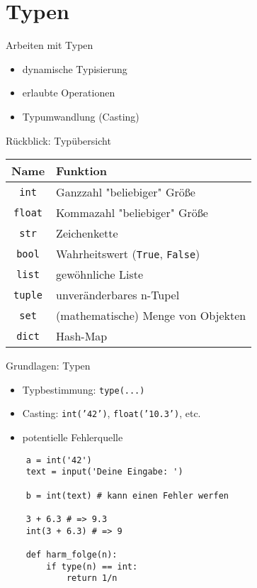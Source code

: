 \section{Typen}
\begin{frame}{Arbeiten mit Typen}
	\begin{itemize}
		\item dynamische Typisierung
		\item erlaubte Operationen
		\item Typumwandlung (Casting)
	\end{itemize}
\end{frame}

\begin{frame}{Rückblick: Typübersicht}
    \begin{tabular}{c|l}
		Name & Funktion \\ \hline
		\texttt{int} & Ganzzahl "beliebiger" Größe \\
		\texttt{float} & Kommazahl "beliebiger" Größe \\
		\texttt{str} & Zeichenkette \\
		\texttt{bool} & Wahrheitswert (\texttt{True}, \texttt{False})\\ \hline
		\texttt{list} & gewöhnliche Liste \\
		\texttt{tuple} & unveränderbares n-Tupel \\
		\texttt{set} & (mathematische) Menge von Objekten \\
		\texttt{dict} & Hash-Map \\
	\end{tabular}
\end{frame}

\begin{frame}[fragile]{Grundlagen: Typen}
	\begin{itemize}
		\item Typbestimmung: \texttt{type(...)}
		\item Casting: \texttt{int('42')}, \texttt{float('10.3')}, etc.
		\item potentielle Fehlerquelle
	\end{itemize}

	\begin{lstlisting}
	a = int('42')
	text = input('Deine Eingabe: ')

	b = int(text) # kann einen Fehler werfen

	3 + 6.3 # => 9.3
	int(3 + 6.3) # => 9

	def harm_folge(n):
		if type(n) == int:
			return 1/n
	\end{lstlisting}



\end{frame}


